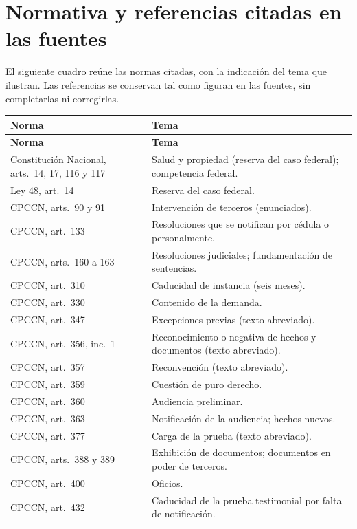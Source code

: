\documentclass[12pt,oneside]{book}
\begin{document}
\appendix
\chapter{Normativa y referencias citadas en las fuentes}

El siguiente cuadro reúne las normas citadas, con la indicación del tema que ilustran. Las referencias se conservan tal como figuran en las fuentes, sin completarlas ni corregirlas.

\begin{longtable}{>{\raggedright\arraybackslash}p{} >{\raggedright\arraybackslash}p{}}
\toprule
\textbf{Norma} & \textbf{Tema} \\
\midrule
\endfirsthead
\toprule
\textbf{Norma} & \textbf{Tema} \\
\midrule
\endhead
\bottomrule
\endfoot
Constitución Nacional, arts.~14, 17, 116 y 117 & Salud y propiedad (reserva del caso federal); competencia federal. \\
Ley 48, art.~14 & Reserva del caso federal. \\
CPCCN, arts.~90 y 91 & Intervención de terceros (enunciados). \\
CPCCN, art.~133 & Resoluciones que se notifican por cédula o personalmente. \\
CPCCN, arts.~160 a 163 & Resoluciones judiciales; fundamentación de sentencias. \\
CPCCN, art.~310 & Caducidad de instancia (seis meses). \\
CPCCN, art.~330 & Contenido de la demanda. \\
CPCCN, art.~347 & Excepciones previas (texto abreviado). \\
CPCCN, art.~356, inc.~1 & Reconocimiento o negativa de hechos y documentos (texto abreviado). \\
CPCCN, art.~357 & Reconvención (texto abreviado). \\
CPCCN, art.~359 & Cuestión de puro derecho. \\
CPCCN, art.~360 & Audiencia preliminar. \\
CPCCN, art.~363 & Notificación de la audiencia; hechos nuevos. \\
CPCCN, art.~377 & Carga de la prueba (texto abreviado). \\
CPCCN, arts.~388 y 389 & Exhibición de documentos; documentos en poder de terceros. \\
CPCCN, art.~400 & Oficios. \\
CPCCN, art.~432 & Caducidad de la prueba testimonial por falta de notificación. \\

\end{longtable}
\end{document}
